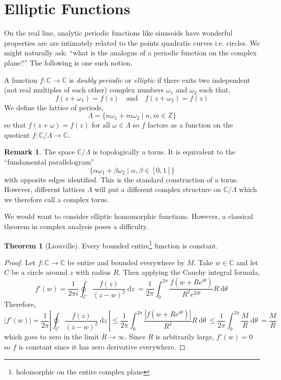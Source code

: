 \documentclass{article}
\newcommand{\Z}{\mathbb{Z}}
\newcommand{\C}{\mathbb{C}}
\renewcommand{\d}[1]{\: \mathrm{d}#1 \:}
\theoremstyle{definition}
\newtheorem{theorem}{Theorem}[section]
\newtheorem{remark}{Remark}[section]
\newenvironment{definition}[1][Definition:]{\begin{trivlist}
\item[\hskip \labelsep {\bfseries #1}]}{\end{trivlist}}
\begin{document}
\section{Elliptic Functions}

On the real line, analytic periodic functions like sinusoids have wonderful properties are are intimately related to the points quadratic curves i.e. circles. We might naturally ask: ``what is the analogue of a periodic function on the complex plane?'' The following is one such notion.

\begin{definition}
A function $f : \C \to \C$ is \textit{doubly periodic} or \textit{elliptic} if there exits two independent (not real multiples of each other) complex numbers $\omega_1$ and $\omega_2$ such that,
\[ f(z + \omega_1) = f(z) \quad \text{and} \quad f(z + \omega_2) = f(z) \]
We define the lattice of periods,
\[ \Lambda = \{ n \omega_1 + m \omega_2 \mid n,m \in \Z \} \]
so that $f(z + \omega) = f(z)$ for all $\omega \in \Lambda$ so $f$ factors as a function on the quotient $f : \C / \Lambda \to \C$. 
\end{definition}

\begin{remark}
The space $\C / \Lambda$ is topologically a torus. It is equivalent to the ``fundamental parallelogram''
\[ \{ \alpha \omega_1 + \beta \omega_2 \mid \alpha, \beta \in [0, 1] \} \]
with opposite edges identified. This is the standard construction of a torus. However, different lattices $\Lambda$ will put a different complex structure on $\C / \Lambda$ which we therefore call a complex torus. 
\end{remark}
\noindent
We would want to consider elliptic homomorphic functions. However, a classical theorem in complex analysis poses a difficulty.

\begin{theorem}[Liouville]
Every bounded entire\footnote{holomorphic on the entire complex plane} function is constant.
\end{theorem}

\begin{proof}
Let $f : \C \to \C$ be entire and bounded everywhere by $M$. Take $w \in \C$ and let $C$ be a circle around $z$ with radius $R$. Then applying the Cauchy integral formula,
\[ f'(w) = \frac{1}{2 \pi i} \oint_C \frac{f(z)}{(z - w)^2} \d{z} = \frac{1}{2 \pi} \int_0^{2 \pi} \frac{f(w + R e^{i \theta})}{R^2 e^{2 i \theta}} R \d{\theta} \]
Therefore,
\[ |f'(w)| = \frac{1}{2 \pi} \left| \oint_C \frac{f(z)}{(z - w)^2} \d{z} \right| \le \frac{1}{2 \pi} \int_0^{2 \pi} \frac{|f(w + R e^{i \theta})|}{R^2} R \d{\theta} \le \frac{1}{2 \pi} \int_0^{2 \pi} \frac{M}{R} \d{\theta} = \frac{M}{R} \]
which goes to zero in the limit $R \to \infty$. Since $R$ is arbitrarily large, $f'(w) = 0$ so $f$ is constant since it has zero derivative everywhere. 
\end{proof}
\end{document}
